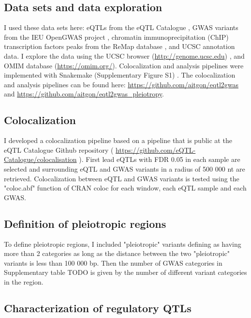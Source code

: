 \subsection*{Data sets and data exploration}

I used these data sets here: eQTLs from the eQTL Catalogue \citep{2021.Alasoo.Kerimov}, GWAS variants from the IEU OpenGWAS project \citep{2021.Marcora.Lyon}, chromatin immunoprecipitation (ChIP) transcription factors peaks from the ReMap database \citep{2021.Ballester.Hammal}, and UCSC annotation data.
%
I explore the data using the UCSC browser (\url{http://genome.ucsc.edu}) \citep{2021.Kent.Lee}, and OMIM database (\url{https://omim.org/}).
%
Colocalization and analysis pipelines were implemented with Snakemake (Supplementary Figure S1) .
%
The colocalization and analysis pipelines can be found here: \url{https://github.com/aitgon/eqtl2gwas} and \url{https://github.com/aitgon/eqtl2gwas_pleiotropy}.

\subsection*{Colocalization}

I developed a colocalization pipeline based on a pipeline that is public at the eQTL Catalogue Github repository ( \url{https://github.com/eQTL-Catalogue/colocalisation} ).
%
First lead eQTLs with FDR 0.05 in each sample are selected and surrounding eQTL and GWAS variants in a radius of 500 000 nt are retrieved.
%
Colocalization between eQTL and GWAS variants is tested using the "coloc.abf" function of CRAN coloc for each window, each eQTL sample and each GWAS.

\subsection*{Definition of pleiotropic regions}

To define pleiotropic regions, I included "pleiotropic" variants defining as having more than 2 categories as long as the distance between the two "pleiotropic" variants is less than 100 000 bp.
%
Then the number of GWAS categories in Supplementary table TODO is given by the number of different variant categories in the region.

\subsection*{Characterization of regulatory QTLs}

